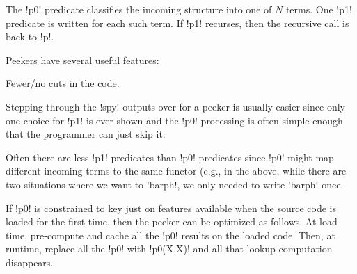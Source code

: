 The !p0! predicate classifies the incoming structure into one of $N$
terms. One !p1! predicate is written for each such term. If !p1!
recurses, then the recursive call is back to !p!.

Peekers have several  useful features: \bi \item Fewer/no cuts in the
code. \item Stepping through the !spy! outputs over for a peeker is
usually easier since only one choice for !p1! is ever shown and the
!p0! processing is often simple enough that the programmer can just
skip it. \item Often there are less !p1! predicates than !p0!
predicates since !p0! might map different incoming terms to the same
functor (e.g., in the above, while there are two situations where we
want to !barph!, we only needed to write !barph! once. \item If !p0!
is constrained to key just on features available when the source code
is loaded for the first time, then the peeker can be optimized as
follows. At load time, pre-compute and cache all the !p0! results on
the loaded code. Then, at runtime, replace all the !p0! with
!p0(X,X)! and all that lookup computation disappears. \ei
